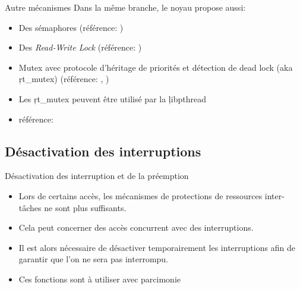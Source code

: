\begin{frame}[fragile=singleslide]{Autre mécanismes}
  Dans la même branche, le noyau propose aussi:
  \begin{itemize}
  \item Des sémaphores (référence: )
  \item       Des       \emph{Read-Write       Lock}       (référence:
    )
  \item Mutex  avec protocole d'héritage de priorités  et détection de
    dead        lock       (aka        \c{rt_mutex})       (référence:
    , )
  \item Les \c{rt_mutex} peuvent être utilisé par la \c{libpthread}
  \item          référence:          
  \end{itemize}
\end{frame}

\subsection{Désactivation des interruptions}

\begin{frame}[fragile=singleslide]{Désactivation des interruption et de la préemption}
  \begin{itemize}
  \item  Lors de  certains  accès, les  mécanismes  de protections  de
    ressources inter-tâches ne sont plus suffisants.
  \item   Cela  peut   concerner   des  accès   concurrent  avec   des
    interruptions.
  \item  Il  est alors  nécessaire  de  désactiver temporairement  les
    interruptions afin de garantir que l'on ne sera pas interrompu.
  \item Ces fonctions sont à utiliser avec parcimonie
  \end{itemize}
\end{frame}

